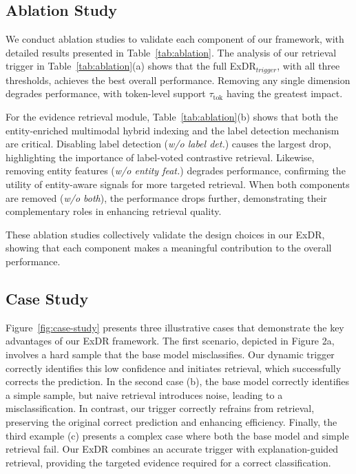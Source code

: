 \subsection{Ablation Study}
We conduct ablation studies to validate each component of our framework, with detailed results presented in Table~\ref{tab:ablation}.
The analysis of our retrieval trigger in Table~\ref{tab:ablation}(a) shows that the full ExDR$_{trigger}$, with all three thresholds, achieves the best overall performance. Removing any single dimension degrades performance, with token-level support $\tau_{\text{tok}}$ having the greatest impact.

For the evidence retrieval module, Table~\ref{tab:ablation}(b) shows that both the entity-enriched multimodal hybrid indexing and the label detection mechanism are critical.  Disabling label detection (\textit{w/o label det.}) causes the largest drop, highlighting the importance of label-voted contrastive retrieval. Likewise, removing entity features (\textit{w/o entity feat.}) degrades performance, confirming the utility of entity-aware signals for more targeted retrieval.  When both components are removed (\textit{w/o both}), the performance drops further, demonstrating their complementary roles in enhancing retrieval quality.

These ablation studies collectively validate the design choices in our ExDR, showing that each component makes a meaningful contribution to the overall performance.


\subsection{Case Study}
Figure~\ref{fig:case-study} presents three illustrative cases that demonstrate the key advantages of our ExDR framework.
The first scenario, depicted in Figure 2a,  involves a hard sample that the base model misclassifies. Our dynamic trigger correctly identifies this low confidence and initiates retrieval, which successfully corrects the prediction.
In the second case (b), the base model correctly identifies a simple sample, but naive retrieval introduces noise, leading to a misclassification. In contrast, our trigger correctly refrains from retrieval, preserving the original correct prediction and enhancing efficiency.
Finally, the third example (c) presents a complex case where both the base model and simple retrieval fail. Our ExDR combines an accurate trigger with explanation-guided retrieval, providing the targeted evidence required for a correct classification.

